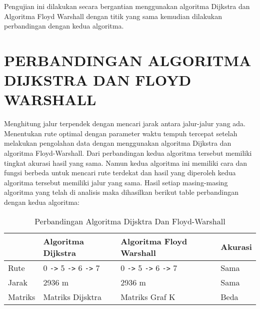 Pengujian ini dilakukan secara bergantian menggunakan algoritma Dijkstra dan Algoritma Floyd Warshall dengan titik yang sama kemudian dilakukan perbandingan dengan kedua algoritma.

\section{PERBANDINGAN ALGORITMA DIJKSTRA DAN FLOYD WARSHALL}
Menghitung jalur terpendek dengan mencari jarak antara jalur-jalur yang ada. Menentukan rute optimal dengan parameter waktu tempuh tercepat setelah melakukan pengolahan data dengan menggunakan algoritma Dijkstra dan algoritma Floyd-Warshall. Dari perbandingan kedua algoritma tersebut memiliki tingkat akurasi hasil yang sama. Namun kedua algoritma ini memiliki cara dan fungsi berbeda untuk mencari rute terdekat dan hasil yang diperoleh kedua algoritma tersebut memiliki jalur yang sama. Hasil setiap masing-masing algoritma yang telah di analisis maka dihasilkan berikut table perbandingan dengan kedua algoritma:
\vspace{4cm}
    \begin{table}[!htbp]
    \centering
    \caption{Perbandingan Algoritma Dijsktra Dan Floyd-Warshall}
    \label{table31}
        \begin{tabular}{|l|l|l|l|}
        \hline
            & Algoritma Dijkstra & Algoritma Floyd Warshall & Akurasi \\
        \hline
            Rute &  0 \verb|->| 5 \verb|->| 6 \verb|->| 7 &  0 \verb|->| 5 \verb|->| 6 \verb|->| 7 & Sama \\
        \hline
            Jarak & 2936 m & 2936 m & Sama \\
        \hline
            Matriks & Matriks Dijsktra & Matriks Graf K & Beda \\
        \hline
    \end{tabular}
    \end{table}
    
    